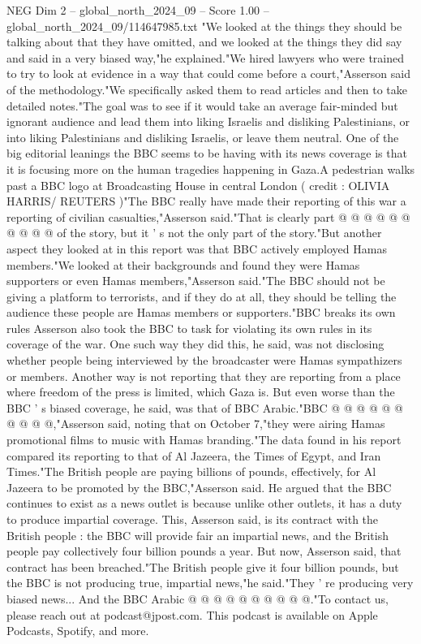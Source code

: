 \begin{textsample}{NEG Dim 2 – global\_north\_2024\_09 – Score 1.00 – global\_north\_2024\_09/114647985.txt}  \label{ex:f2_neg_322}
"We looked at the things they should be talking about that they have omitted, and we looked at the things they did say and said in a very biased way,"he explained."We hired lawyers who were trained to try to look at evidence in a way that could come before a court,"Asserson said of the methodology."We specifically asked them to read articles and then to take detailed notes."The goal was to see if it would take an average fair-minded but ignorant audience and lead them into liking Israelis and disliking Palestinians, or into liking Palestinians and disliking Israelis, or leave them neutral.
One of the big editorial leanings the BBC seems to be having with its news coverage is that it is focusing more on the human tragedies happening in Gaza.A pedestrian walks past a BBC logo at Broadcasting House in central London ( credit : OLIVIA HARRIS/ REUTERS )"The BBC really have made their reporting of this war a reporting of civilian casualties,"Asserson said."That is clearly part @ @ @ @ @ @ @ @ @ @ of the story, but it ' s not the only part of the story."But another aspect they looked at in this report was that BBC actively employed Hamas members."We looked at their backgrounds and found they were Hamas supporters or even Hamas members,"Asserson said."The BBC should not be giving a platform to terrorists, and if they do at all, they should be telling the audience these people are Hamas members or supporters."BBC breaks its own rules Asserson also took the BBC to task for violating its own rules in its coverage of the war.
One such way they did this, he said, was not disclosing whether people being interviewed by the broadcaster were Hamas sympathizers or members.
Another way is not reporting that they are reporting from a place where freedom of the press is limited, which Gaza is.
But even worse than the BBC ' s biased coverage, he said, was that of BBC Arabic."BBC @ @ @ @ @ @ @ @ @ @,"Asserson said, noting that on October 7,"they were airing Hamas promotional films to music with Hamas branding."The data found in his report compared its reporting to that of Al Jazeera, the Times of Egypt, and Iran Times."The British people are paying billions of pounds, effectively, for Al Jazeera to be promoted by the BBC,"Asserson said.
He argued that the BBC continues to exist as a news outlet is because unlike other outlets, it has a duty to produce impartial coverage.
This, Asserson said, is its contract with the British people : the BBC will provide fair an impartial news, and the British people pay collectively four billion pounds a year.
But now, Asserson said, that contract has been breached."The British people give it four billion pounds, but the BBC is not producing true, impartial news,"he said."They ' re producing very biased news...
And the BBC Arabic @ @ @ @ @ @ @ @ @ @."To contact us, please reach out at podcast@jpost.com.
This podcast is available on Apple Podcasts, Spotify, and more.

\end{textsample}
